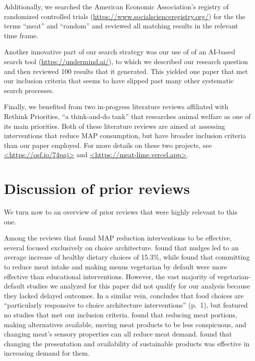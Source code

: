 \documentclass[preprint, 3p,
authoryear]{elsarticle} %
\begin{document}
Additionally, we searched the American Economic Association's registry
of randomized controlled trials
(\url{https://www.socialscienceregistry.org/}) for the the terms
``meat'' and ``random'' and reviewed all matching results in the
relevant time frame.

Another innovative part of our search strategy was our use of of an
AI-based search tool (\url{https://undermind.ai/}), to which we
described our research question and then reviewed 100 results that it
generated. This yielded one paper that met our inclusion criteria
\citep{mattson2020} that seems to have slipped past many other
systematic search processes.

Finally, we benefited from two in-progress literature reviews affiliated
with Rethink Priorities, ``a think-and-do tank'' that researches animal
welfare as one of its main priorities. Both of these literature reviews
are aimed at assessing interventions that reduce MAP consumption, but
have broader inclusion criteria than our paper employed. For more
details on these two projects, see \url{<https://osf.io/74paj>} and
\url{<https://meat-lime.vercel.app>}.

\section{Discussion of prior reviews}\label{discussion-of-prior-reviews}

We turn now to an overview of prior reviews that were highly relevant to
this one.

Among the reviews that found MAP reduction interventions to be
effective, several focused exclusively on choice architecture.
\citep{arno2016} found that nudges led to an average increase of healthy
dietary choices of 15.3\%, while \citep{byerly2018} found that
committing to reduce meat intake and making menus vegetarian by default
were more effective than educational interventions. However, the vast
majority of vegetarian-default studies we analyzed for this paper did
not qualify for our analysis because they lacked delayed outcomes. In a
similar vein, \citep{mertens2022} concludes that food choices are
``particularly responsive to choice architecture interventions'' (p.~1),
but featured no studies that met our inclusion criteria.
\citep{bianchi2018restructuring} found that reducing meat portions,
making alternatives available, moving meat products to be less
conspicuous, and changing meat's sensory properties can all reduce meat
demand. \citep{pandey2023} found that changing the presentation and
availability of sustainable products was effective in increasing demand
for them.
\end{document}
